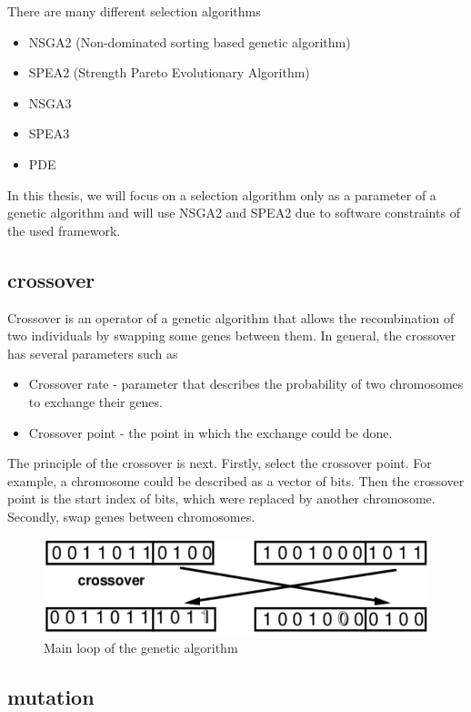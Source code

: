 There are many different selection algorithms
\begin{itemize}
	\item NSGA2 (Non-dominated sorting based genetic algorithm)
	\item SPEA2 (Strength Pareto Evolutionary Algorithm)
	\item NSGA3
	\item SPEA3
	\item PDE 
\end{itemize}
In this thesis, we will focus on a selection algorithm only as a parameter of a genetic algorithm and will use NSGA2 and SPEA2 due to software constraints of the used framework. 
\subsection{crossover}
Crossover is an operator of a genetic algorithm that allows the recombination of two individuals by swapping some genes between them.
In general, the crossover has several parameters such as
\begin{itemize}
	\item Crossover rate - parameter that describes the probability of two chromosomes to exchange their genes.
	\item Crossover point - the point in which the exchange could be done.
\end{itemize}

The principle of the crossover is next.
Firstly, select the crossover point. For example, a chromosome could be described as a vector of bits. Then the crossover point is the start index of bits, which were replaced by another chromosome.
Secondly, swap genes between chromosomes.

\begin{figure}
	\centering
	\includegraphics[width=\textwidth]{images/crossoverVector.png}
	\caption{Main loop of the genetic algorithm}
	\label{fig:crossoverVector}
\end{figure}

\subsection{mutation}


